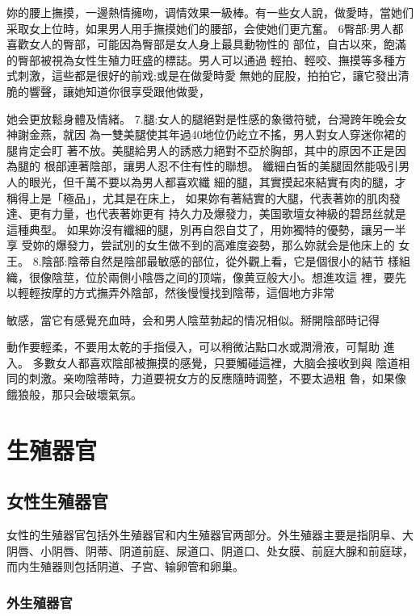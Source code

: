 \documentclass[12pt,UTF8]{ctexbook}
\begin{document}
妳的腰上撫摸，一邊熱情擁吻，调情效果一級棒。有一些女人說，做愛時，當她们采取女上位時，如果男人用手撫摸她们的腰部，会使她们更亢奮。
6臀部:男人都喜歡女人的臀部，可能因為臀部是女人身上最具動物性的
部位，自古以來，飽滿的臀部被視為女性生殖力旺盛的標誌。男人可以通過
輕拍、輕咬、撫摸等多種方式刺激，這些都是很好的前戏;或是在做愛時愛
無她的屁股，拍拍它，讓它發出清脆的響聲，讓她知道你很享受跟他做愛，

她会更放鬆身體及情緒。
7.腿:女人的腿絕對是性感的象徵符號，台灣跨年晚会女神謝金燕，就因
為一雙美腿使其年過40地位仍屹立不搖，男人對女人穿迷你裙的腿肯定会盯
著不放。美腿給男人的誘惑力絕對不亞於胸部，其中的原因不正是因為腿的
根部連著陰部，讓男人忍不住有性的聯想。
纖細白皙的美腿固然能吸引男人的眼光，但千萬不要以為男人都喜欢纖
細的腿，其實摸起來結實有肉的腿，才稱得上是「極品」，尤其是在床上，
如果妳有著結實的大腿，代表著妳的肌肉發達、更有力量，也代表著妳更有
持久力及爆發力，美国歌壇女神級的碧昂丝就是這種典型。
如果妳沒有纖細的腿，別再自怨自艾了，用妳獨特的優勢，讓另一半享
受妳的爆發力，尝試別的女生做不到的高难度姿勢，那么妳就会是他床上的
女王。
8.陰部:陰蒂自然是陰部最敏感的部位，從外觀上看，它是個很小的結节
樣組織，很像陰莖，位於兩側小陰唇之间的顶端，像黄豆般大小。想進攻這
裡，要先以輕輕按摩的方式撫弄外陰部，然後慢慢找到陰蒂，這個地方非常

敏感，當它有感覺充血時，会和男人陰莖勃起的情况相似。掰開陰部時记得

動作要輕柔，不要用太乾的手指侵入，可以稍微沾點口水或潤滑液，可幫助
進入。
多數女人都喜欢陰部被撫摸的感覺，只要觸碰這裡，大脑会接收到與
陰道相同的刺激。亲吻陰蒂時，力道要視女方的反應隨時调整，不要太過粗
魯，如果像餓狼般，那只会破壞氣氛。



\mainmatter

\part{生殖器官}

\chapter{女性生殖器官}

女性的生殖器官包括外生殖器官和内生殖器官两部分。外生殖器主要是指阴阜、大阴唇、小阴唇、阴蒂、阴道前庭、尿道口、阴道口、处女膜、前庭大腺和前庭球，而内生殖器则包括阴道、子宫、输卵管和卵巢。

\section{外生殖器官}
\end{document}
